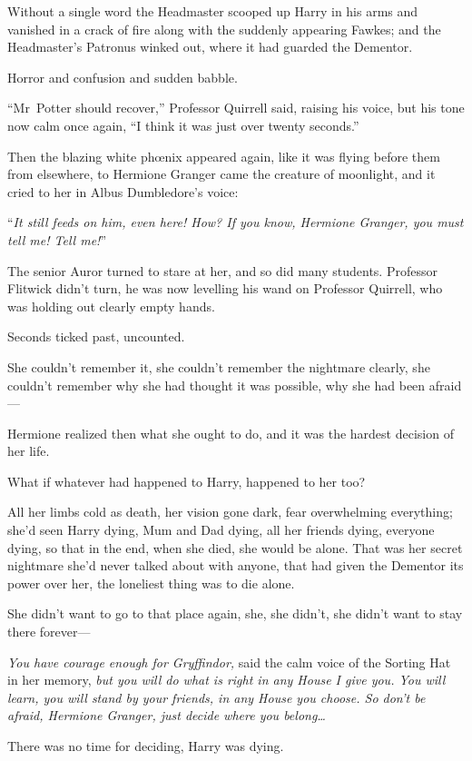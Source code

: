 Without a single word the Headmaster scooped up Harry in his arms and vanished in a crack of fire along with the suddenly appearing Fawkes; and the Headmaster’s Patronus winked out, where it had guarded the Dementor.

Horror and confusion and sudden babble.

“Mr~Potter should recover,” Professor Quirrell said, raising his voice, but his tone now calm once again, “I think it was just over twenty seconds.”

Then the blazing white phœnix appeared again, like it was flying before them from elsewhere, to Hermione Granger came the creature of moonlight, and it cried to her in Albus Dumbledore’s voice:

“\emph{It still feeds on him, even here! How? If you know, Hermione Granger, you must tell me! Tell me!}”

The senior Auror turned to stare at her, and so did many students. Professor Flitwick didn’t turn, he was now levelling his wand on Professor Quirrell, who was holding out clearly empty hands.

Seconds ticked past, uncounted.

She couldn’t remember it, she couldn’t remember the nightmare clearly, she couldn’t remember why she had thought it was possible, why she had been afraid—

Hermione realized then what she ought to do, and it was the hardest decision of her life.

What if whatever had happened to Harry, happened to her too?

All her limbs cold as death, her vision gone dark, fear overwhelming everything; she’d seen Harry dying, Mum and Dad dying, all her friends dying, everyone dying, so that in the end, when she died, she would be alone. That was her secret nightmare she’d never talked about with anyone, that had given the Dementor its power over her, the loneliest thing was to die alone.

She didn’t want to go to that place again, she, she didn’t, she didn’t want to stay there forever—

\emph{You have courage enough for Gryffindor,} said the calm voice of the Sorting Hat in her memory, \emph{but you will do what is right in any House I give you. You will learn, you will stand by your friends, in any House you choose. So don’t be afraid, Hermione Granger, just decide where you belong…}

There was no time for deciding, Harry was dying.

